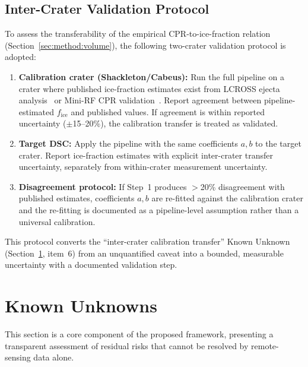 \documentclass[10pt,conference]{IEEEtran}
\newcommand{\Fice}{f_{\mathrm{ice}}}
\begin{document}
\subsection{Inter-Crater Validation Protocol}
\label{sec:intercater}

To assess the transferability of the empirical CPR-to-ice-fraction
relation (Section~\ref{sec:method:volume}), the following
two-crater validation protocol is adopted:

\begin{enumerate}
  \item \textbf{Calibration crater (Shackleton/Cabeus):}
    Run the full pipeline on a crater where published ice-fraction
    estimates exist from LCROSS ejecta analysis~\cite{colaprete2010lcross}
    or Mini-RF CPR validation~\cite{spudis2013mini}.
    Report agreement between pipeline-estimated $\Fice$ and
    published values. If agreement is within reported uncertainty
    ($\pm$15--20\%), the calibration transfer is treated as validated.

  \item \textbf{Target DSC:}
    Apply the pipeline with the same coefficients $a, b$ to the
    target crater. Report ice-fraction estimates with explicit
    inter-crater transfer uncertainty, separately from
    within-crater measurement uncertainty.

  \item \textbf{Disagreement protocol:}
    If Step~1 produces $>$20\% disagreement with published estimates,
    coefficients $a, b$ are re-fitted against the calibration crater
    and the re-fitting is documented as a pipeline-level assumption
    rather than a universal calibration.
\end{enumerate}

This protocol converts the ``inter-crater calibration transfer''
Known Unknown (Section~\ref{sec:unknowns}, item~6) from an
unquantified caveat into a bounded, measurable uncertainty with
a documented validation step.

\section{Known Unknowns}
\label{sec:unknowns}

This section is a core component of the proposed framework, presenting a transparent assessment of residual risks that cannot be resolved by remote-sensing data alone.
\end{document}
